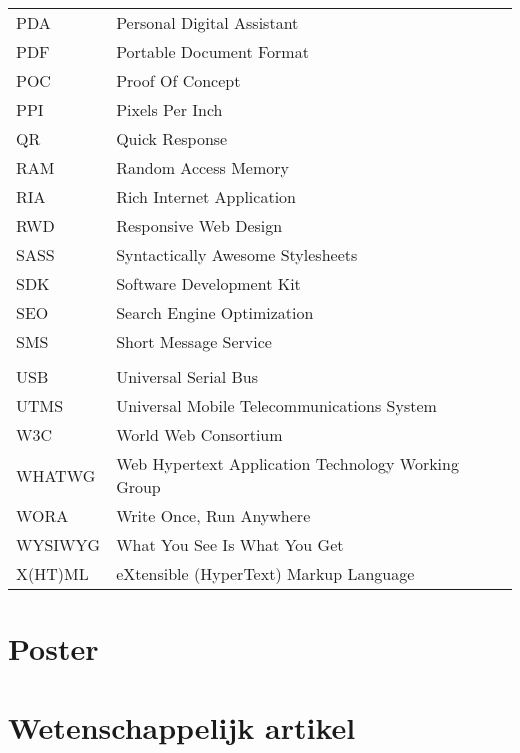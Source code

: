 \documentclass[master=cws,dutch,masteroption={vs,gs},inputenc=utf8]{kulemt}
\begin{document}
\begin{flushleft}
\begin{longtable}{p{2cm} l}
     PDA & Personal Digital Assistant \\
     PDF & Portable Document Format \\
     POC & Proof Of Concept \\
     PPI & Pixels Per Inch \\
     QR & Quick Response \\
     RAM & Random Access Memory \\
     RIA & Rich Internet Application \\
     RWD & Responsive Web Design \\
     SASS & Syntactically Awesome Stylesheets \\
     SDK & Software Development Kit \\
     SEO & Search Engine Optimization \\
     SMS & Short Message Service \\
     \sta{} & \st{} \\
     USB & Universal Serial Bus \\
     UTMS & Universal Mobile Telecommunications System \\
     W3C & World Web Consortium \\
     WHATWG & Web Hypertext Application Technology Working Group \\
     WORA & Write Once, Run Anywhere \\
     WYSIWYG & What You See Is What You Get \\
     X(HT)ML & eXtensible (HyperText) Markup Language \\ 
  \end{longtable}
\end{flushleft}

\mainmatter













\appendixpage*          
\appendix
\chapter{Poster}

\chapter{Wetenschappelijk artikel}




\backmatter


\end{document}

